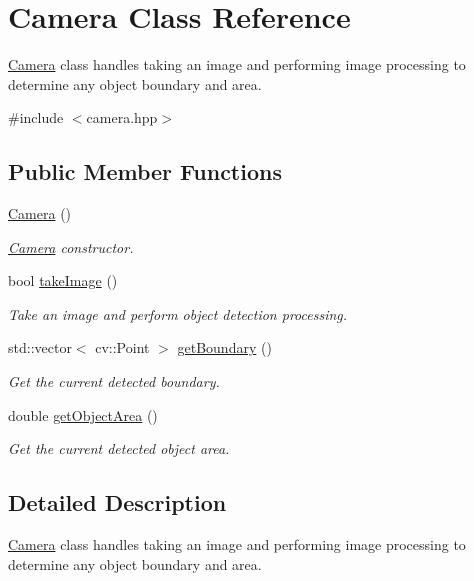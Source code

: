 \hypertarget{classCamera}{\section{Camera Class Reference}
\label{classCamera}
}


\hyperlink{classCamera}{Camera} class handles taking an image and performing image processing to determine any object boundary and area.  




{\ttfamily \#include $<$camera.\-hpp$>$}

\subsection*{Public Member Functions}
\begin{DoxyCompactItemize}
\item 
\hyperlink{classCamera_a01f94c3543f56ede7af49dc778f19331}{Camera} ()
\begin{DoxyCompactList}\small\item\em \hyperlink{classCamera}{Camera} constructor. \end{DoxyCompactList}\item 
bool \hyperlink{classCamera_a63a7881aca6e8ad390b4317aa722db20}{take\-Image} ()
\begin{DoxyCompactList}\small\item\em Take an image and perform object detection processing. \end{DoxyCompactList}\item 
std\-::vector$<$ cv\-::\-Point $>$ \hyperlink{classCamera_a8e82c4a9785070177c4cbbffffa3bd99}{get\-Boundary} ()
\begin{DoxyCompactList}\small\item\em Get the current detected boundary. \end{DoxyCompactList}\item 
double \hyperlink{classCamera_a283301a4e9901811410348b3c8133c49}{get\-Object\-Area} ()
\begin{DoxyCompactList}\small\item\em Get the current detected object area. \end{DoxyCompactList}\end{DoxyCompactItemize}


\subsection{Detailed Description}
\hyperlink{classCamera}{Camera} class handles taking an image and performing image processing to determine any object boundary and area. 

